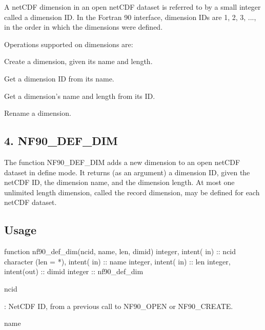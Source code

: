 A net\+C\+DF dimension in an open net\+C\+DF dataset is referred to by a small integer called a dimension ID. In the Fortran 90 interface, dimension I\+Ds are 1, 2, 3, ..., in the order in which the dimensions were defined.

Operations supported on dimensions are\+:


\begin{DoxyItemize}
\item Create a dimension, given its name and length.
\item Get a dimension ID from its name.
\item Get a dimension’s name and length from its ID.
\item Rename a dimension.
\end{DoxyItemize}\hypertarget{f90_dimensions_f90-nf90_def_dim}{}\subsection{4. N\+F90\+\_\+\+D\+E\+F\+\_\+\+D\+I\+M }\label{f90_dimensions_f90-nf90_def_dim}
The function N\+F90\+\_\+\+D\+E\+F\+\_\+\+D\+IM adds a new dimension to an open net\+C\+DF dataset in define mode. It returns (as an argument) a dimension ID, given the net\+C\+DF ID, the dimension name, and the dimension length. At most one unlimited length dimension, called the record dimension, may be defined for each net\+C\+DF dataset.

\subsection*{Usage}


\begin{DoxyCode}
\textcolor{keyword}{function }nf90\_def\_dim(ncid, name, len, dimid)
  \textcolor{keywordtype}{integer},             \textcolor{keywordtype}{intent( in)} :: ncid
  \textcolor{keywordtype}{character (len = *)}, \textcolor{keywordtype}{intent( in)} :: name
  \textcolor{keywordtype}{integer},             \textcolor{keywordtype}{intent( in)} :: len
  \textcolor{keywordtype}{integer},             \textcolor{keywordtype}{intent(out)} :: dimid
  \textcolor{keywordtype}{integer}                          :: nf90\_def\_dim
\end{DoxyCode}


{\ttfamily ncid}

\+: Net\+C\+DF ID, from a previous call to N\+F90\+\_\+\+O\+P\+EN or N\+F90\+\_\+\+C\+R\+E\+A\+TE.

{\ttfamily name}

